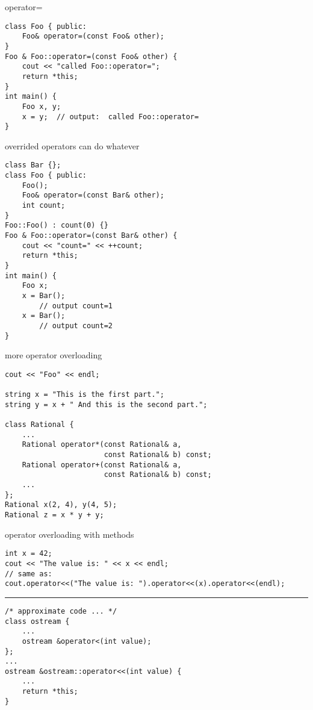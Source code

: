 \begin{frame}[fragile,label=opOverload1]{operator=}
\lstset{language=C++,style=smaller}
\begin{lstlisting}
class Foo { public:
    Foo& operator=(const Foo& other);
}
Foo & Foo::operator=(const Foo& other) {
    cout << "called Foo::operator=";
    return *this;
}
int main() {
    Foo x, y;
    x = y;  // output:  called Foo::operator=
}
\end{lstlisting}
\end{frame}

\begin{frame}[fragile,label=opOverload2]{overrided operators can do whatever}
\lstset{language=C++,style=smaller}
\begin{lstlisting}
class Bar {};
class Foo { public:
    Foo();
    Foo& operator=(const Bar& other);
    int count;
}
Foo::Foo() : count(0) {}
Foo & Foo::operator=(const Bar& other) {
    cout << "count=" << ++count;
    return *this;
}
int main() {
    Foo x;
    x = Bar();
        // output count=1
    x = Bar();
        // output count=2
}
\end{lstlisting}
\end{frame}


\begin{frame}[fragile,label=opOverExs]{more operator overloading}
\lstset{language=C++,style=smaller}
\begin{lstlisting}
cout << "Foo" << endl;

string x = "This is the first part.";
string y = x + " And this is the second part.";

class Rational {
    ...
    Rational operator*(const Rational& a,
                       const Rational& b) const;
    Rational operator+(const Rational& a,
                       const Rational& b) const;
    ...
};
Rational x(2, 4), y(4, 5);
Rational z = x * y + y;
\end{lstlisting}
\end{frame}

\begin{frame}[fragile,label=opImplMeth]{operator overloading with methods}
\lstset{language=C++,style=smaller}
\begin{lstlisting}
int x = 42;
cout << "The value is: " << x << endl;
// same as:
cout.operator<<("The value is: ").operator<<(x).operator<<(endl);
\end{lstlisting}
\hrule
\begin{lstlisting}
/* approximate code ... */
class ostream {
    ...
    ostream &operator<(int value);
};
...
ostream &ostream::operator<<(int value) {
    ...
    return *this;
}
\end{lstlisting}
\end{frame}

